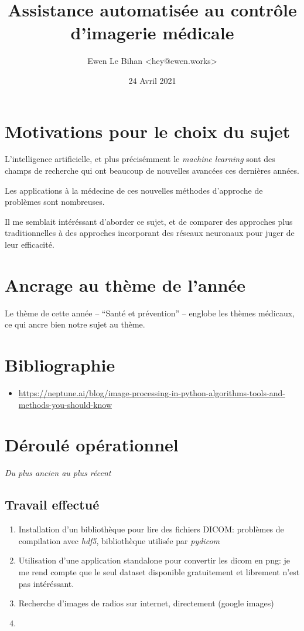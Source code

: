 \documentclass{article}
\title{Assistance automatisée au contrôle d'imagerie médicale}
\author{Ewen Le Bihan \textless hey@ewen.works\textgreater}
\date{24 Avril 2021}
\begin{document}
\maketitle

\section{Motivations pour le choix du sujet}

L'intelligence artificielle, et plus précisémment le \emph{machine learning} sont des champs de recherche
qui ont beaucoup de nouvelles avancées ces dernières années.

Les applications à la médecine de ces nouvelles méthodes d'approche de problèmes sont nombreuses.

Il me semblait intéréssant d'aborder ce sujet, et de comparer des approches plus traditionnelles à des approches
incorporant des réseaux neuronaux pour juger de leur efficacité.

\section{Ancrage au thème de l'année}

Le thème de cette année -- ``Santé et prévention'' -- englobe les thèmes médicaux, ce qui ancre bien notre sujet
au thème. 

\section{Bibliographie}

\begin{itemize}
	\item \url{https://neptune.ai/blog/image-processing-in-python-algorithms-tools-and-methods-you-should-know}
\end{itemize}

\section{Déroulé opérationnel}

\emph{Du plus ancien au plus récent} 

\subsection{Travail effectué}


\begin{enumerate}
\item Installation d'un bibliothèque pour lire des fichiers DICOM: problèmes de compilation avec \emph{hdf5}, bibliothèque utilisée par \emph{pydicom} 
\item Utilisation d'une application standalone pour convertir les dicom en png: je me rend compte que le seul dataset disponible gratuitement et librement
  n'est pas intéréssant.
\item Recherche d'images de radios sur internet, directement (google images)
\item 
\end{enumerate}
\end{document}
